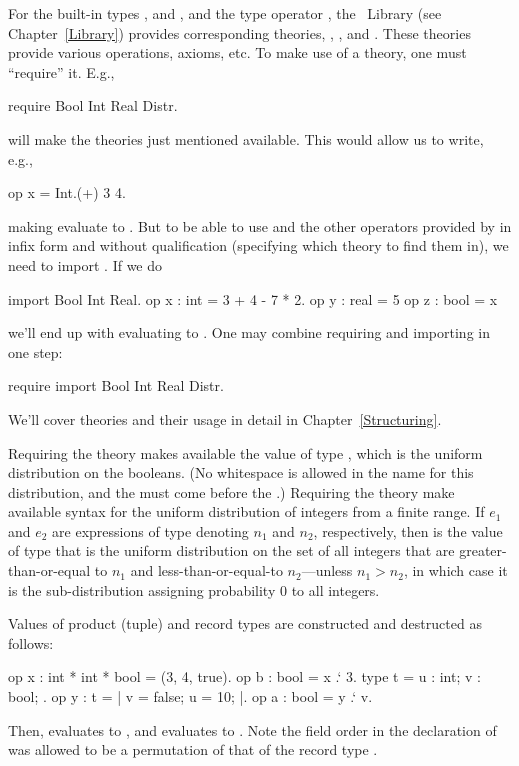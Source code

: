 For the built-in types ,  and , and the type
operator , the \EasyCrypt\ Library (see
Chapter~\ref{Library}) provides corresponding theories, ,
,  and . These theories provide various
operations, axioms, etc.  To make use of a theory, one must
``require'' it.  E.g.,
\begin{easycrypt}{}{}
require Bool Int Real Distr.
\end{easycrypt}
will make the theories just mentioned available. This
would allow us to write, e.g.,
\begin{easycrypt}{}{}
op x = Int.(+) 3 4.
\end{easycrypt}
making  evaluate to . But to be able to use \ec{+}
and the other operators provided by 
in infix form and without qualification (specifying which theory to
find them in), we need to import . If we do
\begin{easycrypt}{}{}
import Bool Int Real.
op x : int = 3 + 4 - 7 * 2.
op y : real = 5%
op z : bool = x%
\end{easycrypt}
we'll end up with  evaluating to .
One may combine requiring and importing in one step:
\begin{easycrypt}{}{}
require import Bool Int Real Distr.
\end{easycrypt}
We'll cover theories and their usage in detail in
Chapter~\ref{Structuring}.

Requiring the theory  makes available the value 
of type , which is the uniform distribution on
the booleans. (No whitespace is allowed in the name for this distribution,
and the  must come before the .)
Requiring the theory  make available syntax for the uniform
distribution of integers from a finite range. If $e_1$ and $e_2$
are expressions of type  denoting $n_1$ and $n_2$, respectively,
then \ec{[$e_1$..$e_2$]} is the value of type 
that is the uniform distribution on the set of
all integers that are greater-than-or-equal to $n_1$ and less-than-or-equal-to
$n_2$---unless $n_1>n_2$, in which case it is the sub-distribution assigning
probability $0$ to all integers.

Values of product (tuple) and record types are constructed and
destructed as follows:
\begin{easycrypt}{}{}
op x : int * int * bool = (3, 4, true).
op b : bool = x .` 3.
type t = { u : int; v : bool; }.
op y : t = {| v = false; u = 10; |}.
op a : bool = y .` v.
\end{easycrypt}
Then,  evaluates to , and  evaluates to .
Note the field order in the declaration of  was allowed to be
a permutation of that of the record type .

